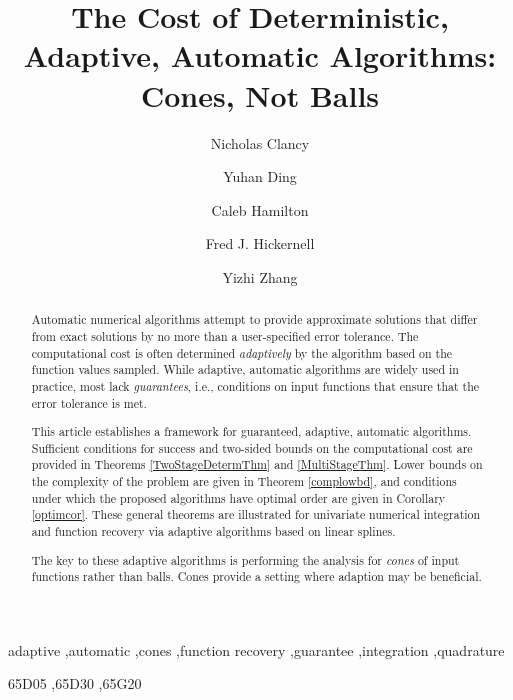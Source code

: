 \documentclass[]{elsarticle}
\theoremstyle{definition}
\theoremstyle{remark}
\begin{document}
\begin{frontmatter}

\title{The Cost of Deterministic, Adaptive, Automatic Algorithms:  Cones, Not Balls}
\author{Nicholas Clancy}
\author{Yuhan Ding} 
\author{Caleb Hamilton}
\author{Fred J. Hickernell} 
\author{Yizhi Zhang} 
\address{Room E1-208, Department of Applied Mathematics, Illinois Institute of Technology,\\ 10 W.\ 32$^{\text{nd}}$ St., Chicago, IL 60616}

\begin{abstract} 
Automatic numerical algorithms attempt to provide approximate solutions that differ from exact solutions by no more than a user-specified error tolerance. The computational cost is often determined \emph{adaptively} by the algorithm based on the function values sampled. While adaptive, automatic algorithms are widely used in practice, most lack \emph{guarantees}, i.e., conditions on input functions that ensure that the error tolerance is met. 

This article establishes a framework for guaranteed, adaptive, automatic algorithms. Sufficient conditions for success and two-sided bounds on the computational cost are provided in Theorems \ref{TwoStageDetermThm} and \ref{MultiStageThm}.  Lower bounds on the complexity of the problem are given in Theorem \ref{complowbd}, and conditions under which the proposed algorithms have optimal order are given in Corollary \ref{optimcor}. These general theorems are illustrated for univariate numerical integration and function recovery via adaptive algorithms based on linear splines.  

The key to these adaptive algorithms is performing the analysis for \emph{cones} of input functions rather than balls.  Cones provide a setting where adaption may be beneficial.
\end{abstract}

\begin{keyword}
adaptive \sep automatic \sep cones \sep function recovery \sep guarantee \sep integration \sep quadrature

\MSC[2010] 65D05 \sep 65D30 \sep 65G20

\end{keyword}
\end{frontmatter}
\end{document}
